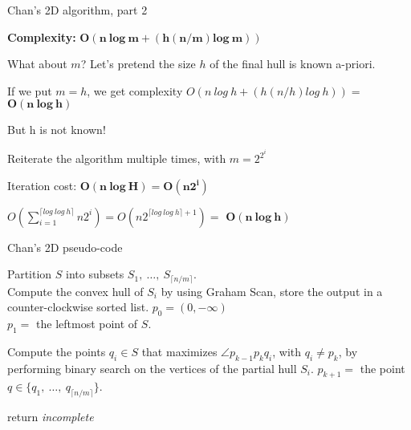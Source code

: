 \documentclass[14pt, handout]{beamer}
\begin{document}
\begin{frame}{Chan's 2D algorithm, part 2}
	\begin{center}
		\vspace{-5mm}
		\begin{fullpageitemize}
			\item<1-> \textbf{Complexity:} \textcolor{colorgreen}{$\bm{O(n\ log\ m + (h(n/m)log\ m))}$}
			\item<2-> What about $m$? Let's pretend the size $h$ of the final hull is known a-priori.
			\item<3-> If we put $m = h$, we get complexity $O(n\ log\ h + (h(n/h)log\ h)) =$ \textcolor{colorgreen}{$\bm{O(n\ log\ h)}$}
			\item<4-> But h is not known! 
			
			\fontsize{12}{14}\notosansfont
			\begin{sublist}
				\item Reiterate the algorithm multiple times, with $m = 2^{2^{i}}$
				\item Iteration cost: \textcolor{colorgreen}{$\bm{O(n\ log\ H) = O(n2^i)}$}
				\item $O\left(\sum_{i = 1}^{\lceil log\ log\ h\rceil}{n2^i}\right) = O(n2^{\lceil log\ log\ h\rceil + 1}) =$ \textcolor{colorgreen}{$\bm{O(n\ log\ h)}$}
			\end{sublist}
			
			
		\end{fullpageitemize}
	\end{center}
\end{frame}

\begin{frame}{Chan's 2D pseudo-code}
	\fontsize{8}{10}\notosansfont
	\begin{algorithm}[H]
		\DontPrintSemicolon
		\SetAlgoVlined
		Partition $S$ into subsets $S_1,\ \ldots,\ S_{\lceil n/m \rceil}$.\\
		{
			Compute the convex hull of $S_i$ by using Graham Scan, store the output in a counter-clockwise sorted list.
		}  
		$p_0 = (0, -\infty)$\\
		$p_1 =$ the leftmost point of $S$.
		
		{
			{
				Compute the points $q_i \in S$ that maximizes $\angle p_{k-1}p_kq_i$, with $q_i \ne p_k$, by performing binary search on the vertices of the partial hull $S_i$.
			}
			$p_{k+1} = $ the point $q \in \{q_1,\ \ldots,\ q_{\lceil n/m \rceil}\}$.\\
		}
		
		return \textit{incomplete}
		\caption{ChanHullStep, a step of Chan's algorithm}
	\end{algorithm}
\end{frame}
\end{document}
